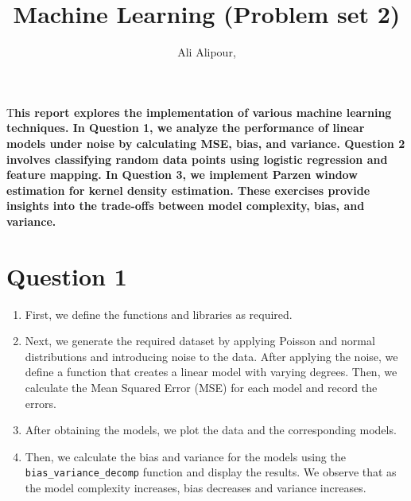 \documentclass[DIV=calc, paper=a4, fontsize=11pt, twocolumn]{scrartcl}	 %
\title{Machine Learning (Problem set 2)} %
\author{Ali Alipour, } %
\date{} %
\newcommand{\initial}[1]{ %
\lettrine[lines=3,lhang=0.3,nindent=0em]{
\color{DarkGoldenrod}
{\textsf{#1}}}{}}
\begin{document}
\maketitle %

\thispagestyle{fancy} %


\initial{T}\textbf{his report explores the implementation of various machine learning techniques. 
                   In Question 1, we analyze the performance of linear models under noise by calculating MSE, 
                   bias, and variance. Question 2 involves classifying random data points using logistic regression 
                   and feature mapping. In Question 3, we implement Parzen window estimation for kernel density estimation. 
                   These exercises provide insights into the trade-offs between model complexity, bias, and variance.}

\section*{\small{Question 1}}

\begin{enumerate}
    \item First, we define the functions and libraries as required.
    \item Next, we generate the required dataset by applying Poisson and normal distributions and introducing noise to the data. After applying the noise, we define a function that creates a linear model with varying degrees. Then, we calculate the Mean Squared Error (MSE) for each model and record the errors.
    \item After obtaining the models, we plot the data and the corresponding models.
    \item Then, we calculate the bias and variance for the models using the \texttt{bias\_variance\_decomp} function and display the results. We observe that as the model complexity increases, bias decreases and variance increases.
\end{enumerate}
\end{document}
